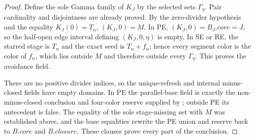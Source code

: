 \begin{proof}
Define the sole Gamma family of $K_J$ by the selected sets
$\Gamma_\eta$.  Pair cardinality and disjointness are already proved.  By
the zero-divider hypothesis and the equality $K_J(0)=T_n$,
$(K_J,0)=M$.  In PE,
$(K_J,0)=B_J.\mathit{core}=J$, so the
half-open edge interval defining
$(K_J,0,\eta)$ is empty.  In SE or RE,
the starred stage is $T_n$ and the exact seed is $T_n+f_n$; hence every
segment color is the color of $f_n$, which lies outside $M$ and therefore
outside every $\Gamma_\eta$.  This proves the avoidance field.

There are no positive divider indices, so the unique-refresh and internal
minus-closed fields have empty domains.  In PE the parallel-base field is
exactly the non-minus-closed conclusion and four-color reserve supplied
by ; outside PE its antecedent is
false.  The equality of the sole stage-missing set with $M$ was established
above, and the base equalities rewrite the PE union and reserve back to
$B.\mathit{core}$ and $B.\mathit{closure}$.  These clauses prove every
part of the conclusion.
\end{proof}
